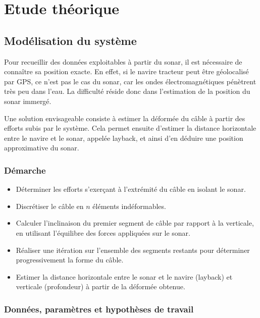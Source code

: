 \documentclass[12pt,a4paper]{report}
\begin{document}
\chapter{Etude théorique}

\section{Modélisation du système}

Pour recueillir des données exploitables à partir du sonar, il est nécessaire de connaître sa position exacte.
En effet, si le navire tracteur peut être géolocalisé par GPS, ce n’est pas le cas du sonar, car les ondes électromagnétiques pénètrent très peu dans l’eau.
La difficulté réside donc dans l’estimation de la position du sonar immergé.

Une solution envisageable consiste à estimer la déformée du câble à partir des efforts subis par le système.
Cela permet ensuite d’estimer la distance horizontale entre le navire et le sonar, appelée layback, et ainsi d’en déduire une position approximative du sonar.

\subsection{Démarche}

\begin{itemize}


  \item Déterminer les efforts s'exerçant à l'extrémité du câble en isolant le sonar.
  \item Discrétiser le câble en $n$ éléments indéformables.
  \item Calculer l'inclinaison du premier segment de câble par rapport à la verticale, en utilisant l'équilibre des forces appliquées sur le sonar.
  \item Réaliser une itération sur l’ensemble des segments restants pour déterminer progressivement la forme du câble.
  \item Estimer la distance horizontale entre le sonar et le navire (layback) et verticale (profondeur) à partir de la déformée obtenue.

\end{itemize}

\subsection{Données, paramètres et hypothèses de travail}
\end{document}
